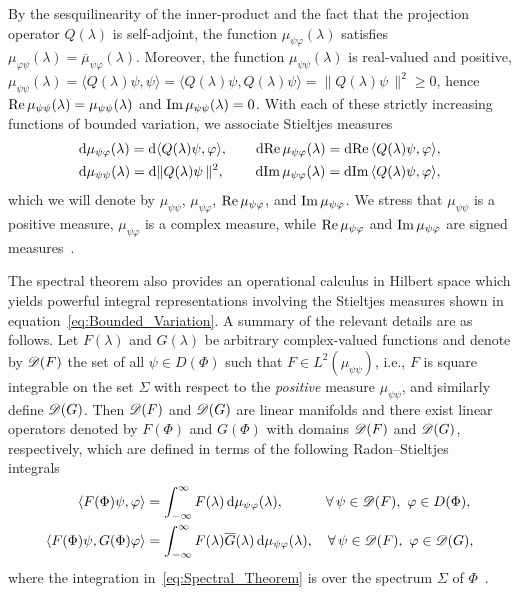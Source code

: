 \documentclass[amsa]{ipart}
\begin{document}
By the sesquilinearity of the inner-product and the fact that the
projection operator $Q(\lambda)$ is self-adjoint, the function $\mu_{\psi\varphi}(\lambda)$
satisfies $\mu_{\varphi\psi}(\lambda)=\overline{\mu}_{\psi\varphi}(\lambda)$. Moreover, the function
$\mu_{\psi\psi}(\lambda)$ is real-valued and positive, $\mu_{\psi\psi}(\lambda)=\langle Q(\lambda)\psi,\psi\rangle=\langle
Q(\lambda)\psi,Q(\lambda)\psi\rangle=\|Q(\lambda)\psi\,\|^2\geq0$, hence $\mbox{Re}\,\mu_{\psi\psi}(\lambda)=\mu_{\psi\psi}(\lambda)$ and
$\mbox{Im}\,\mu_{\psi\psi}(\lambda)=0$. With each of these strictly increasing functions
of bounded variation, we associate Stieltjes
measures~\cite{Stieltjes:1995,Stone:64,Folland:99:RealAnalysis}  
%
\begin{align}\label{eq:Bounded_Variation}
  &\d\mu_{\psi\varphi}(\lambda)=\d\langle Q(\lambda)\psi,\varphi\rangle, \qquad
  \d\Real\mu_{\psi\varphi}(\lambda)=\d\Real\langle Q(\lambda)\psi,\varphi\rangle,\\  
  &\d\mu_{\psi\psi}(\lambda)=\d\|Q(\lambda)\psi\,\|^2, \qquad
  \hspace{0.2em}
  \d\Imag\mu_{\psi\varphi}(\lambda)=\d\Imag\langle Q(\lambda)\psi,\varphi\rangle,
  \notag
\end{align}
%
which we will denote by $\mu_{\psi\psi}$, $\mu_{\psi\varphi}$, $\mbox{Re}\,\mu_{\psi\varphi}$, and
$\mbox{Im}\,\mu_{\psi\varphi}$. We stress that $\mu_{\psi\psi}$ is a positive measure, $\mu_{\psi\varphi}$
is a complex measure, while $\mbox{Re}\,\mu_{\psi\varphi}$ and $\mbox{Im}\,\mu_{\psi\varphi}$ are signed
measures~\cite{Stieltjes:1995,Stone:64}.  



The spectral theorem also provides an operational calculus in Hilbert
space which yields powerful integral representations involving the
Stieltjes measures shown in
equation~\eqref{eq:Bounded_Variation}. A summary of the relevant
details are as   
follows. Let $F(\lambda)$ and $G(\lambda)$ be arbitrary complex-valued functions
and denote by $\mathscr{D}(F)$ the set of all $\psi\in D(\Phi)$ such that
$F\in L^2(\mu_{\psi\psi})$, i.e., $F$ is square integrable on the set
$\Sigma$ with respect to the \emph{positive} measure $\mu_{\psi\psi}$, and similarly define
$\mathscr{D}(G)$. Then $\mathscr{D}(F)$ and $\mathscr{D}(G)$ are linear manifolds and there
exist linear operators denoted by $F(\Phi)$ and $G(\Phi)$ with domains
$\mathscr{D}(F)$ and $\mathscr{D}(G)$, respectively, which are defined in terms of the
following Radon--Stieltjes integrals~\cite{Stone:64}  
%
\begin{align}\label{eq:Spectral_Theorem}
  \langle F(\Phi)\psi,\varphi\rangle&=\int_{-\infty}^\infty F(\lambda)\,\d\mu_{\psi\varphi}(\lambda), \qquad
  \hspace{1em}
  \forall \, \psi\in\mathscr{D}(F), \ \varphi\in D(\Phi),  
  \\
  \langle F(\Phi)\psi,G(\Phi)\varphi\rangle&=\int_{-\infty}^\infty F(\lambda)\overline{G}(\lambda)\,\d\mu_{\psi\varphi}(\lambda),
  \quad
  \forall \, \psi\in\mathscr{D}(F), \ \varphi\in\mathscr{D}(G),
  \notag
\end{align}
%
where the integration in~\eqref{eq:Spectral_Theorem} is over the
spectrum $\Sigma$ of $\Phi$~\cite{Reed-1980,Stone:64}.
\end{document}
